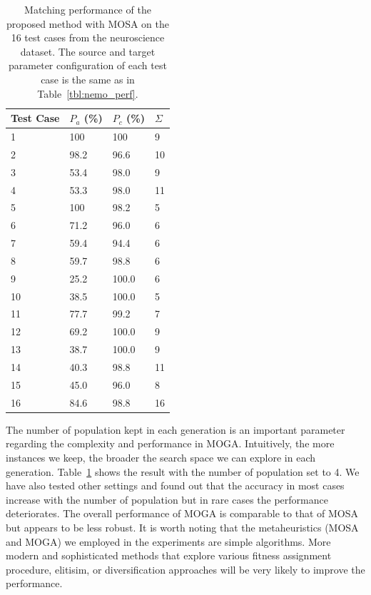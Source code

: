 \begin{table}[tbh]
\begin{center}
\begin{tabular}{l|l|l|l}
\hline
Test Case	&	$P_a$ (\%)	&	$P_c$ (\%) &   $\Sigma$    \\
\hline
1	&	100	&	100	  &   9\\
2	&	98.2	&	96.6	&   10\\
3	&	53.4	&	98.0	 &  9\\
4	&	53.3	&	98.0	&   11\\
5	&	100	&	98.2	&    5\\
6	&	71.2	&	96.0	&   6\\
7	&	59.4	&	94.4	&   6\\
8	&	59.7	&	98.8	&   6\\
9	&	25.2	&	100.0	&6 \\
10	&	38.5	&	100.0	& 5\\
11	&	77.7	&	99.2	&  7\\
12	&	69.2	&	100.0	& 9\\
13	&	38.7	&	100.0	& 9\\
14	&	40.3	&	98.8	&  11\\
15	&	45.0	&	96.0	&  8\\
16	&	84.6	&	98.8	&  16\\
\hline
\end{tabular}
\end{center}
\caption{\label{tbl:moga_neuro} Matching performance of the proposed method with MOSA on the 16 test cases from the neuroscience dataset. The source and target parameter configuration of each test case is the same as in Table~\ref{tbl:nemo_perf}.}
\end{table}

The number of population kept in each generation is an important parameter regarding the complexity and performance in MOGA. Intuitively, the more instances we keep, the broader the search space we can explore in each generation. Table~\ref{tbl:moga_neuro} shows the result with the number of population set to 4. We have also tested other settings and found out that the accuracy in most cases increase with the number of population but in rare cases the performance deteriorates. The overall performance of MOGA is comparable to that of MOSA but appears to be less robust. It is worth noting that the metaheuristics (MOSA and MOGA) we employed in the experiments are simple algorithms. More modern and sophisticated methods that explore various fitness assignment procedure, elitisim, or diversification approaches will be very likely to improve the performance.


